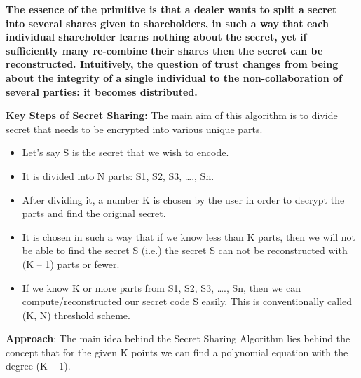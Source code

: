 \documentclass[conference]{IEEEtran}
\begin{document}
\textbf{The essence of the primitive is that a dealer wants to split a secret into several shares given to shareholders, in such a way that each individual shareholder learns nothing about the secret, yet if sufficiently many re-combine their shares then the secret can be reconstructed. Intuitively, the question of trust changes from being about the integrity of a single individual to the non-collaboration of several parties: it becomes distributed.}

\vspace{\baselineskip}

\textbf{Key Steps of Secret Sharing:} 
The main aim of this algorithm is to divide secret that needs to be encrypted into various unique parts.

\begin{itemize}

\item Let’s say S is the secret that we wish to encode.


\vspace{\baselineskip}

\item It is divided into N parts: S1, S2, S3, …., Sn.

\vspace{\baselineskip}

\item After dividing it, a number K is chosen by the user in order to decrypt the parts and find the original secret.

\vspace{\baselineskip}

\item It is chosen in such a way that if we know less than K parts, then we will not be able to find the secret S (i.e.) the secret S can not be reconstructed with (K – 1) parts or fewer.

\vspace{\baselineskip}

\item If we know K or more parts from S1, S2, S3, …., Sn, then we can compute/reconstructed our secret code S easily. This is conventionally called (K, N) threshold scheme.

\vspace{\baselineskip}

\end{itemize}

\textbf{Approach}: The main idea behind the Secret Sharing Algorithm lies behind the concept that for the given K points we can find a polynomial equation with the degree (K – 1).
\end{document}
